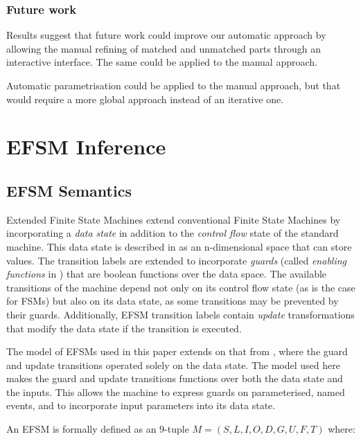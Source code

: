 \subsubsection{Future work}

Results suggest that future work could improve our automatic approach by 
allowing the manual refining of matched and unmatched parts through an 
interactive interface. The same could be applied to the manual approach.

Automatic parametrisation could be applied to the manual approach, but that 
would require a more global approach instead of an iterative one.

\section{EFSM Inference}
\label{EFSMInference}

\subsection{EFSM Semantics}
\label{EFSMSemantics}

Extended Finite State Machines extend conventional Finite State Machines by incorporating a \emph{data state} in addition to the \emph{control flow} state of the standard machine. This data state is described in \cite{EFSMs} as an n-dimensional space that can store values. The transition labels are extended to incorporate \emph{guards} (called \emph{enabling functions} in \cite{EFSMs}) that are boolean functions over the data space. The available transitions of the machine depend not only on its control flow state (as is the case for FSMs) but also on its data state, as some transitions may be prevented by their guards. Additionally, EFSM transition labels contain \emph{update} transformations that modify the data state if the transition is executed. 

The model of EFSMs used in this paper extends on that from \cite{EFSMs}, where the guard and update transitions operated solely on the data state. The model used here makes the guard and update transitions functions over both the data state and the inputs. This allows the machine to express guards on parameterised, named events, and to incorporate input parameters into its data state.
  
An EFSM is formally defined as an 9-tuple $M = (S,L,I,O,D,G,U,F,T)$ where:


